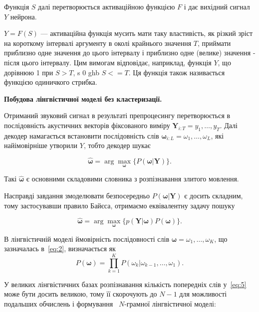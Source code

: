 \documentclass{diploma}
\begin{document}
Функція $S$ далі перетворюється активаційною функцією $F$ і дає вихідний сигнал $Y$ нейрона.

$Y = F(S)$ --- активаційна функція мусить мати таку властивість, як різкий зріст на короткому інтервалі аргументу в околі крайнього значення $T$, приймати приблизно одне значення до цього інтервалу і приблизно одне (велике) значення - після цього інтервалу. Цим вимогам відповідає, наприклад, функція $Y$, що дорівнюю 1 при $S>T$, s 0 ghb $S<=T$. Ця функція також називається функцією одиничкого стрибка.~\cite{u1}



\textbf{Побудова лінгвістичної моделі без кластеризації.}

Отриманий звуковий сигнал в результаті препроцесингу перетворюється в послідовність акустичних векторів фіксованого виміру $\boldsymbol Y_{i:T} = y_1,\dots,y_T$. Далі декодер намагається встановити послідовність слів $\boldsymbol\omega_{i:L} = \omega_1,\dots,\omega_L$, які найімовірніше утворили $Y$, тобто декодер шукає

\begin{equation}
\label{eq:5}
\boldsymbol{\hat{\omega}} = \arg \max_{\boldsymbol\omega}\{P(\boldsymbol\omega|\boldsymbol Y)\}. 
\end{equation}

Такі $\boldsymbol{\hat{\omega}}$ є основними складовими словника з розпізнавання злитого мовлення.

Насправді завдання змоделювати безпосередньо $P(\boldsymbol\omega|\boldsymbol Y)$ є досить складним, тому застосувавши правило Байєса, отримаємо еквівалентну задачу пошуку 

\begin{equation}
\label{eq:6}
\boldsymbol{\hat{\omega}} = \arg \max_{\boldsymbol\omega}\{p(\boldsymbol Y|\boldsymbol\omega)P(\boldsymbol\omega)\}.
\end{equation}


В лінгвістичній моделі ймовірність послідовності слів $\boldsymbol\omega = \omega_1,\dots,\omega_K$, що зазначалась в~\eqref{eq:2}, визначається як 
\begin{equation}
\label{eq:7}
P(\boldsymbol\omega) = \prod_{k=1}^K P(\omega_k|\omega_{k-1},\dots,\omega_1).
\end{equation}

У великих лінгвістичних базах розпізнавання кількість попередніх слів у~\eqref{eq:5} може бути досить великою, тому її скорочують до $N-1$ для можливості подальших обчислень і формування ~$N$-грамної лінгвістичної моделі:
\end{document}
